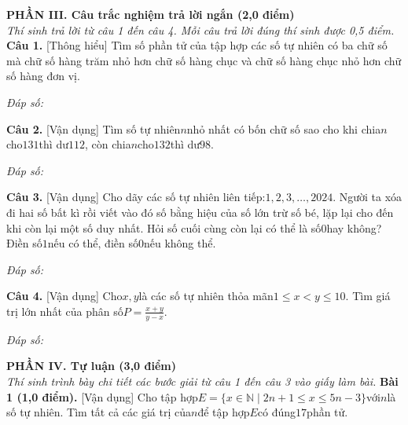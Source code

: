 \documentclass[11pt,a4paper]{article}
\begin{document}
\vspace{6pt}
\noindent
\textbf{\large PHẦN III. Câu trắc nghiệm trả lời ngắn (2,0 điểm)}\\
\textit{\small Thí sinh trả lời từ câu 1 đến câu 4. Mỗi câu trả lời đúng thí sinh được 0,5 điểm.}
\vspace{6pt}
\noindent\textbf{Câu 1.} [Thông hiểu] Tìm số phần tử của tập hợp các số tự nhiên có ba chữ số mà chữ số hàng trăm nhỏ hơn chữ số hàng chục và chữ số hàng chục nhỏ hơn chữ số hàng đơn vị.\par\vspace{2pt}
\noindent\textit{Đáp số:} \dotfill\par\vspace{6pt}

\noindent\textbf{Câu 2.} [Vận dụng] Tìm số tự nhiên$n$nhỏ nhất có bốn chữ số sao cho khi chia$n$cho$131$thì dư$112$, còn chia$n$cho$132$thì dư$98$.\par\vspace{2pt}
\noindent\textit{Đáp số:} \dotfill\par\vspace{6pt}

\noindent\textbf{Câu 3.} [Vận dụng] Cho dãy các số tự nhiên liên tiếp:$1, 2, 3, \dots, 2024$. Người ta xóa đi hai số bất kì rồi viết vào đó số bằng hiệu của số lớn trừ số bé, lặp lại cho đến khi còn lại một số duy nhất. Hỏi số cuối cùng còn lại có thể là số$0$hay không? Điền số$1$nếu có thể, điền số$0$nếu không thể.\par\vspace{2pt}
\noindent\textit{Đáp số:} \dotfill\par\vspace{6pt}

\noindent\textbf{Câu 4.} [Vận dụng] Cho$x, y$là các số tự nhiên thỏa mãn$1 \le x < y \le 10$. Tìm giá trị lớn nhất của phân số$P = \frac{x + y}{y - x}$.\par\vspace{2pt}
\noindent\textit{Đáp số:} \dotfill\par\vspace{6pt}


\vspace{6pt}
\noindent
\textbf{\large PHẦN IV. Tự luận (3,0 điểm)}\\
\textit{\small Thí sinh trình bày chi tiết các bước giải từ câu 1 đến câu 3 vào giấy làm bài.}
\vspace{6pt}
\noindent\textbf{Bài 1 (1,0 điểm).} [Vận dụng] Cho tập hợp$E = \{x \in \mathbb{N} \mid 2n + 1 \le x \le 5n - 3\}$với$n$là số tự nhiên. Tìm tất cả các giá trị của$n$để tập hợp$E$có đúng$17$phần tử.\par\vspace{8pt}
\end{document}
